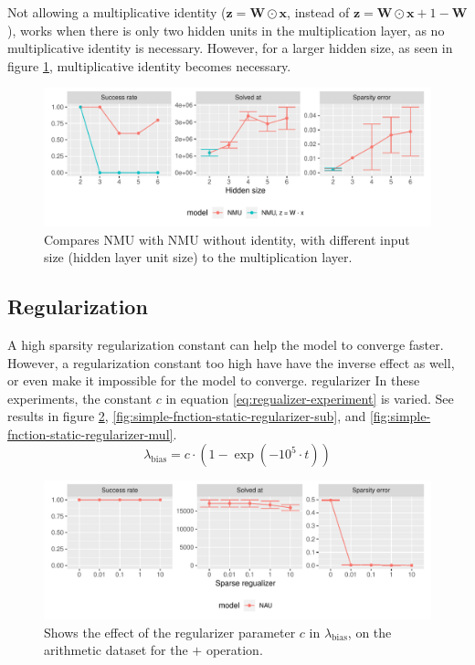 Not allowing a multiplicative identity ($\mathbf{z} = \mathbf{W} \odot \mathbf{x}$, instead of $\mathbf{z} = \mathbf{W} \odot \mathbf{x} + 1 - \mathbf{W}$), works when there is only two hidden units in the multiplication layer, as no multiplicative identity is necessary. However, for a larger hidden size, as seen in figure \ref{fig:simple-function-static-ablation-hidden-size}, multiplicative identity becomes necessary.
\begin{figure}[h]
\centering
\includegraphics[width=\linewidth]{results/simple_function_static_ablation_hidden_size.pdf}
\caption{Compares NMU with NMU without identity, with different input size (hidden layer unit size) to the multiplication layer.}
\label{fig:simple-function-static-ablation-hidden-size}
\end{figure}

\subsection{Regularization}
\label{sec:appendix:simple-function-task:regualization}
A high sparsity regularization constant can help the model to converge faster. However, a regularization constant too high have have the inverse effect as well, or even make it impossible for the model to converge.
regularizer
In these experiments, the constant $c$ in equation \ref{eq:regualizer-experiment} is varied. See results in figure \ref{fig:simple-fnction-static-regularizer-add}, \ref{fig:simple-fnction-static-regularizer-sub}, and \ref{fig:simple-fnction-static-regularizer-mul}.
\begin{equation}
\lambda_{\mathrm{bias}} = c \cdot (1 - \exp(-10^5 \cdot t))
\label{eq:regualizer-experiment}
\end{equation}

\begin{figure}[h]
\centering
\includegraphics[width=\linewidth]{results/simple_function_static_regualization_add.pdf}
\caption{Shows the effect of the regularizer parameter $c$ in $\lambda_{\mathrm{bias}}$, on the  arithmetic dataset for the $\bm{+}$ operation.}
\label{fig:simple-fnction-static-regularizer-add}
\end{figure}

